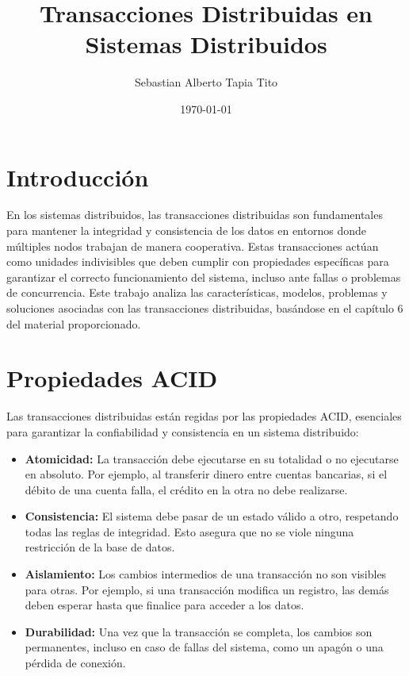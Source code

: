 \documentclass[12pt,a4paper]{article}
\title{\textbf{Transacciones Distribuidas en Sistemas Distribuidos}}
\author{Sebastian Alberto Tapia Tito}
\date{\today}
\begin{document}
\maketitle
\tableofcontents
\newpage

\section{Introducción}
En los sistemas distribuidos, las transacciones distribuidas son fundamentales para mantener la integridad y consistencia de los datos en entornos donde múltiples nodos trabajan de manera cooperativa. Estas transacciones actúan como unidades indivisibles que deben cumplir con propiedades específicas para garantizar el correcto funcionamiento del sistema, incluso ante fallas o problemas de concurrencia.  
Este trabajo analiza las características, modelos, problemas y soluciones asociadas con las transacciones distribuidas, basándose en el capítulo 6 del material proporcionado.

\section{Propiedades ACID}
Las transacciones distribuidas están regidas por las propiedades ACID, esenciales para garantizar la confiabilidad y consistencia en un sistema distribuido:
\begin{itemize}
    \item \textbf{Atomicidad:} La transacción debe ejecutarse en su totalidad o no ejecutarse en absoluto. Por ejemplo, al transferir dinero entre cuentas bancarias, si el débito de una cuenta falla, el crédito en la otra no debe realizarse.
    \item \textbf{Consistencia:} El sistema debe pasar de un estado válido a otro, respetando todas las reglas de integridad. Esto asegura que no se viole ninguna restricción de la base de datos.
    \item \textbf{Aislamiento:} Los cambios intermedios de una transacción no son visibles para otras. Por ejemplo, si una transacción modifica un registro, las demás deben esperar hasta que finalice para acceder a los datos.
    \item \textbf{Durabilidad:} Una vez que la transacción se completa, los cambios son permanentes, incluso en caso de fallas del sistema, como un apagón o una pérdida de conexión.
\end{itemize}
\end{document}
